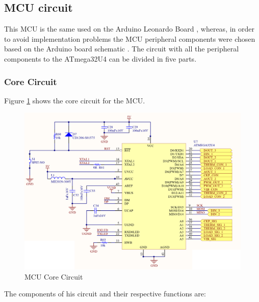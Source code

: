	\subsection{MCU circuit}\label{ssec:mcu-circuit}

		This MCU is the same used on the Arduino Leonardo Board \cite{arduino-leonardo}, whereas, in order to avoid implementation problems the MCU peripheral components were chosen based on the Arduino board schematic \cite{arduino-leonardo-schematic}. The circuit with all the peripheral components to the ATmega32U4 can be divided in five parts.

		\subsubsection{Core Circuit}\label{sssec:core-circuit}
			Figure \ref{fig:mcu-core-circuit} shows the core circuit for the MCU.

			\begin{figure}[htbp]
				\centering
				\includegraphics[width=1\textwidth]{figuras/fig-mcu-core-circuit}
				\caption{MCU Core Circuit}
				\label{fig:mcu-core-circuit}
			\end{figure}

			The components of his circuit and their respective functions are:

